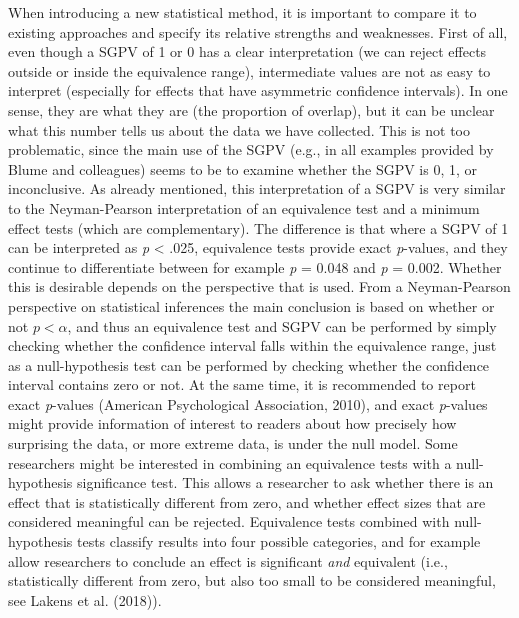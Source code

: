 \documentclass[,man,floatsintext]{apa6}
\begin{document}
When introducing a new statistical method, it is important to compare it
to existing approaches and specify its relative strengths and
weaknesses. First of all, even though a SGPV of 1 or 0 has a clear
interpretation (we can reject effects outside or inside the equivalence
range), intermediate values are not as easy to interpret (especially for
effects that have asymmetric confidence intervals). In one sense, they
are what they are (the proportion of overlap), but it can be unclear
what this number tells us about the data we have collected. This is not
too problematic, since the main use of the SGPV (e.g., in all examples
provided by Blume and colleagues) seems to be to examine whether the
SGPV is 0, 1, or inconclusive. As already mentioned, this interpretation
of a SGPV is very similar to the Neyman-Pearson interpretation of an
equivalence test and a minimum effect tests (which are complementary).
The difference is that where a SGPV of 1 can be interpreted as \emph{p}
\textless{} .025, equivalence tests provide exact \emph{p}-values, and
they continue to differentiate between for example \emph{p} = 0.048 and
\emph{p} = 0.002. Whether this is desirable depends on the perspective
that is used. From a Neyman-Pearson perspective on statistical
inferences the main conclusion is based on whether or not
\(p < \alpha\), and thus an equivalence test and SGPV can be performed
by simply checking whether the confidence interval falls within the
equivalence range, just as a null-hypothesis test can be performed by
checking whether the confidence interval contains zero or not. At the
same time, it is recommended to report exact \emph{p}-values (American
Psychological Association, 2010), and exact \emph{p}-values might
provide information of interest to readers about how precisely how
surprising the data, or more extreme data, is under the null model. Some
researchers might be interested in combining an equivalence tests with a
null-hypothesis significance test. This allows a researcher to ask
whether there is an effect that is statistically different from zero,
and whether effect sizes that are considered meaningful can be rejected.
Equivalence tests combined with null-hypothesis tests classify results
into four possible categories, and for example allow researchers to
conclude an effect is significant \emph{and} equivalent (i.e.,
statistically different from zero, but also too small to be considered
meaningful, see Lakens et al. (2018)).
\end{document}
